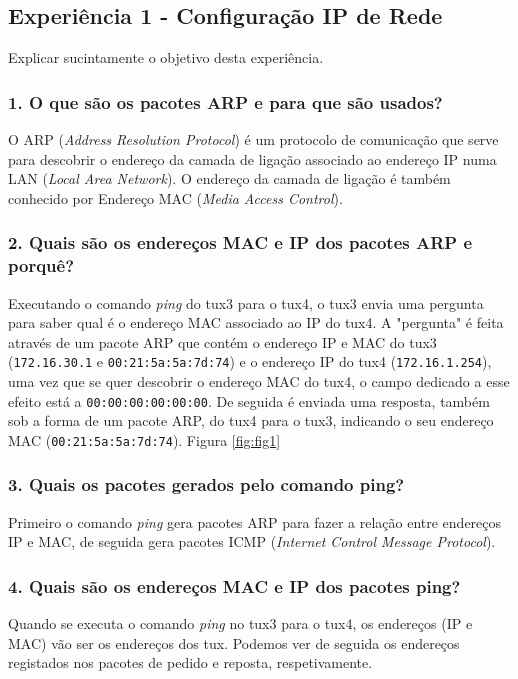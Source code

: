 \subsection*{Experiência 1 - Configuração IP de Rede}
Explicar sucintamente o objetivo desta experiência.

\subsubsection{1. O que são os pacotes ARP e para que são usados?}
O ARP (\emph{Address Resolution Protocol}) é um protocolo de comunicação que serve para descobrir o endereço da camada de ligação associado ao endereço IP numa LAN (\emph{Local Area Network}). O endereço da camada de ligação é também conhecido por Endereço MAC (\emph{Media Access Control}).

\subsubsection{2. Quais são os endereços MAC e IP dos pacotes ARP e porquê?}
Executando o comando \emph{ping} do tux3 para o tux4, o tux3 envia uma pergunta para saber qual é o endereço MAC associado ao IP do tux4. A "pergunta" é feita através de um pacote ARP que contém o endereço IP e MAC do tux3 (\verb+172.16.30.1+ e \verb+00:21:5a:5a:7d:74+) e o endereço IP do tux4 (\verb+172.16.1.254+), uma vez que se quer descobrir o endereço MAC do tux4, o campo dedicado a esse efeito está a \verb+00:00:00:00:00:00+. De seguida é enviada uma resposta, também sob a forma de um pacote ARP, do tux4 para o tux3, indicando o seu endereço MAC (\verb+00:21:5a:5a:7d:74+). Figura \ref{fig:fig1}

\subsubsection{3. Quais os pacotes gerados pelo comando ping?}
Primeiro o comando \emph{ping} gera pacotes ARP para fazer a relação entre endereços IP e MAC, de seguida gera pacotes ICMP (\emph{Internet Control Message Protocol}).

\subsubsection{4. Quais são os endereços MAC e IP dos pacotes ping?}
Quando se executa o comando \emph{ping} no tux3 para o tux4, os endereços (IP e MAC) vão ser os endereços dos tux. Podemos ver de seguida os endereços registados nos pacotes de pedido e reposta, respetivamente.

